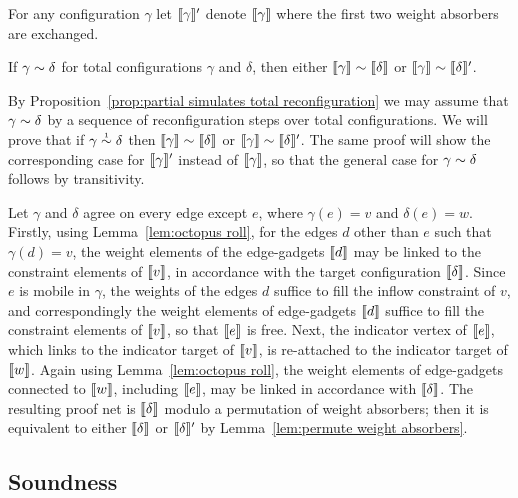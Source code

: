 \documentclass[conference]{IEEEtran}
\begin{document}
For any configuration $\gamma$ let $\llbracket\gamma\rrbracket'$ denote $\llbracket\gamma\rrbracket$ where the first two weight absorbers are exchanged.


\begin{lemma}
\label{lem:completeness}
If $\gamma\perm\delta$ for total configurations $\gamma$ and $\delta$, then either $\itn\gamma\perm\itn\delta$ or $\itn\gamma\perm\itn\delta'$.
\end{lemma}

\begin{IEEEproof}
By Proposition~\ref{prop:partial simulates total reconfiguration} we may assume that $\gamma\perm\delta$ by a sequence of reconfiguration steps over total configurations.
%
We will prove that if $\gamma\perm*\delta$ then $\itn\gamma\perm\itn\delta$ or $\itn\gamma\perm\itn\delta'$.
%
The same proof will show the corresponding case for $\llbracket\gamma\rrbracket'$ instead of $\llbracket\gamma\rrbracket$, so that the general case for $\gamma\perm\delta$ follows by transitivity.



Let $\gamma$ and $\delta$ agree on every edge except $e$, where $\gamma(e)=v$ and $\delta(e)=w$.
%
Firstly, using Lemma~\ref{lem:octopus roll}, for the edges $d$ other than $e$ such that $\gamma(d)=v$, the weight elements of the edge-gadgets $\llbracket d\rrbracket$ may be linked to the constraint elements of $\llbracket v\rrbracket$, in accordance with the target configuration $\llbracket\delta\rrbracket$.
%
Since $e$ is mobile in $\gamma$, the weights of the edges $d$ suffice to fill the inflow constraint of $v$, and correspondingly the weight elements of edge-gadgets $\llbracket d\rrbracket$ suffice to fill the constraint elements of $\llbracket v\rrbracket$, so that $\llbracket e\rrbracket$ is free.
%
Next, the indicator vertex of $\llbracket e\rrbracket$, which links to the indicator target of $\llbracket v\rrbracket$, is re-attached to the indicator target of $\llbracket w\rrbracket$.
%
Again using Lemma~\ref{lem:octopus roll}, the weight elements of edge-gadgets connected to $\llbracket w\rrbracket$, including $\llbracket e\rrbracket$, may be linked in accordance with $\llbracket\delta\rrbracket$.
%
The resulting proof net is $\llbracket\delta\rrbracket$ modulo a permutation of weight absorbers; then it is equivalent to either $\llbracket\delta\rrbracket$ or $\llbracket\delta\rrbracket'$ by Lemma~\ref{lem:permute weight absorbers}.
\end{IEEEproof}



\subsection*{Soundness}
\end{document}
